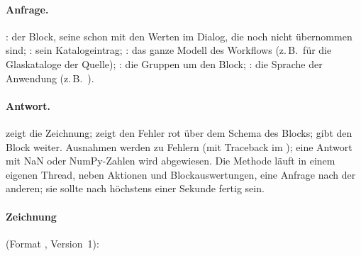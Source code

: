 \paragraph{Anfrage.} : der Block, seine  schon mit den Werten im Dialog,
die noch nicht übernommen sind; : sein Katalogeintrag; : das ganze Modell
des Workflows (z.\,B.\ für die Glaskataloge der Quelle); : die Gruppen um den Block;
: die Sprache der Anwendung (z.\,B.\ ).

\paragraph{Antwort.}  zeigt die Zeichnung;
 zeigt den Fehler rot über dem Schema des Blocks;
 gibt den Block weiter. Ausnahmen werden zu Fehlern
(mit Traceback im ); eine Antwort mit NaN oder NumPy-Zahlen wird abgewiesen.
Die Methode läuft in einem eigenen Thread, neben Aktionen und Blockauswertungen, eine Anfrage
nach der anderen; sie sollte nach höchstens einer Sekunde fertig sein.

\paragraph{Zeichnung} (Format , Version~1):

